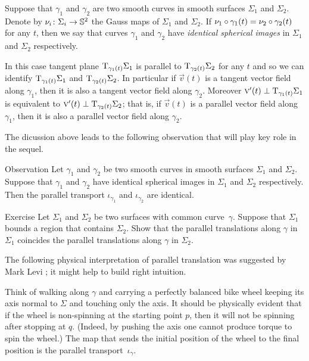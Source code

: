 Suppose that $\gamma_1$ and $\gamma_2$ are two smooth curves in smooth surfaces $\Sigma_1$ and $\Sigma_2$.
Denote by $\nu_i\colon\Sigma_i\to\mathbb{S}^2$ the Gauss maps of $\Sigma_1$ and $\Sigma_2$.
If $\nu_1\circ\gamma_1(t)= \nu_2\circ\gamma_2(t)$ for any $t$, then we say that curves $\gamma_1$ and $\gamma_2$ have \emph{identical spherical images} in $\Sigma_1$ and $\Sigma_2$ respectively.

In this case tangent plane $\mathrm{T}_{\gamma_1(t)}\Sigma_1$ is parallel to $\mathrm{T}_{\gamma_2(t)}\Sigma_2$ for any $t$ and so we can identify $\mathrm{T}_{\gamma_1(t)}\Sigma_1$ and $\mathrm{T}_{\gamma_2(t)}\Sigma_2$.
In particular if $\vec v(t)$ is a tangent vector field along $\gamma_1$,
then it is also a tangent vector field along $\gamma_2$.
Moreover $\textsc v'(t)\perp \mathrm{T}_{\gamma_1(t)}\Sigma_1$ is equivalent to $\textsc v'(t)\perp \mathrm{T}_{\gamma_2(t)}\Sigma_2$; that is, if $\vec v(t)$ is a parallel vector field along $\gamma_1$,
then it is also a parallel vector field along $\gamma_2$.

The dicussion above leads to the following observation that will play key role in the sequel.

\begin{thm}{Observation}\label{obs:parallel=}
Let $\gamma_1$ and $\gamma_2$ be two smooth curves in smooth surfaces $\Sigma_1$ and $\Sigma_2$.
Suppose that $\gamma_1$ and $\gamma_2$ have identical spherical images in $\Sigma_1$ and $\Sigma_2$ respectively.
Then the parallel transport $\iota_{\gamma_1}$ and $\iota_{\gamma_2}$ are identical. 
\end{thm}

\begin{thm}{Exercise}\label{ex:parallel-transport-support}
Let $\Sigma_1$ and $\Sigma_2$ be two surfaces with common curve~$\gamma$.
Suppose that $\Sigma_1$ bounds a region that contains $\Sigma_2$.
Show that the parallel translations along $\gamma$ in $\Sigma_1$ 
coincides the parallel translations along $\gamma$ in $\Sigma_2$. 
\end{thm}

The following physical interpretation of parallel translation was suggested by Mark Levi \cite{levi};
it might help to build right intuition.

Think of walking along $\gamma$ and carrying a perfectly balanced bike wheel keeping its axis normal to $\Sigma$ and touching only the axis.
It should be physically evident that if the wheel is non-spinning at the starting point $p$, then it will not be spinning after stopping at $q$.
(Indeed, by pushing the axis one cannot produce torque to spin the wheel.)
The map that sends the initial position of the wheel to the final position is  the parallel transport~$\iota_\gamma$.

